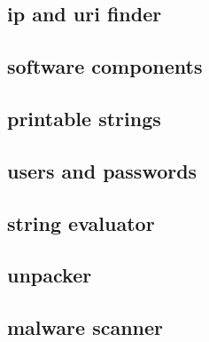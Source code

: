 \documentclass{article}
\begin{document}
\subsection*{ip and uri finder}


\subsection*{software components}


\subsection*{printable strings}


\subsection*{users and passwords}


\subsection*{string evaluator}


\subsection*{unpacker}


\subsection*{malware scanner}

\end{document}
